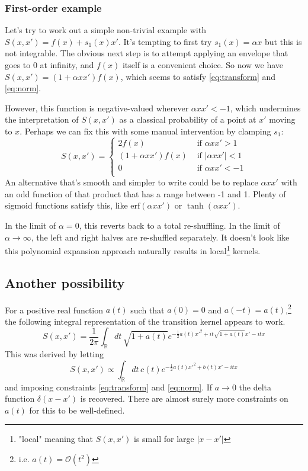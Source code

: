 \documentclass{article}
\newcommand{\intR}{\int_{\mathbb{R}}}
\begin{document}
\subsubsection{First-order example}

Let's try to work out a simple non-trivial example with $S(x, x') = f(x) +
s_1(x) x'$. It's tempting to first try $s_1(x) = \alpha x$ but this is not
integrable. The obvious next step is to attempt applying an envelope that goes
to 0 at infinity, and $f(x)$ itself is a convenient choice. So now we have
$S(x, x') = \left( 1 + \alpha x x'\right) f(x)$, which seems to satisfy
\ref{eq:transform} and \ref{eq:norm}.

However, this function is negative-valued wherever $\alpha x x' < -1$, which
undermines the interpretation of $S(x, x')$ as a classical probability of a
point at $x'$ moving to $x$. Perhaps we can fix this with some manual
intervention by clamping $s_1$:
\begin{equation}
 S(x, x') = \begin{cases}
  2 f(x) &\text{ if } \alpha x x' > 1\\
  \left(1 + \alpha x x'\right) f(x) &\text{ if } |\alpha x x'| < 1 \\
  0 &\text{ if } \alpha x x' < -1\\
 \end{cases} 
\end{equation}
An alternative that's smooth and simpler to write could be to replace $\alpha x
x'$ with an odd function of that product that has a range between -1 and 1.
Plenty of sigmoid functions satisfy this, like $\textrm{erf}(\alpha x x')$ or
$\tanh (\alpha x x')$.

In the limit of $\alpha=0$, this reverts back to a total re-shuffling. In the
limit of $\alpha \rightarrow \infty$, the left and right halves are re-shuffled
separately. It doesn't look like this polynomial expansion approach naturally
results in local\footnote{"local" meaning that $S(x, x')$ is small for large
$|x-x'|$} kernels.

\subsection{Another possibility}

For a positive real function $a(t)$ such that
$a(0) = 0$ and $a(-t) = a(t)$,\footnote{i.e. $a(t) = \mathcal{O}(t^2)$} the
following integral representation of the transition kernel appears to work.
\begin{equation}
	S(x, x') = \frac{1}{2\pi} \intR dt\, \sqrt{1 + a(t)} e^{-\frac{1}{2}a(t) x'^2 + it\sqrt{1+a(t)}x' - itx}
\end{equation}
This was derived by letting
\[S(x, x') \propto \intR dt\, c(t) e^{-\frac{1}{2}a(t)x'^2 + b(t)x' - itx} \]
and imposing constraints \ref{eq:transform} and \ref{eq:norm}. If $a \rightarrow 0$ the
delta function $\delta(x-x')$ is recovered. There are almost surely more
constraints on $a(t)$ for this to be well-defined.
\end{document}
